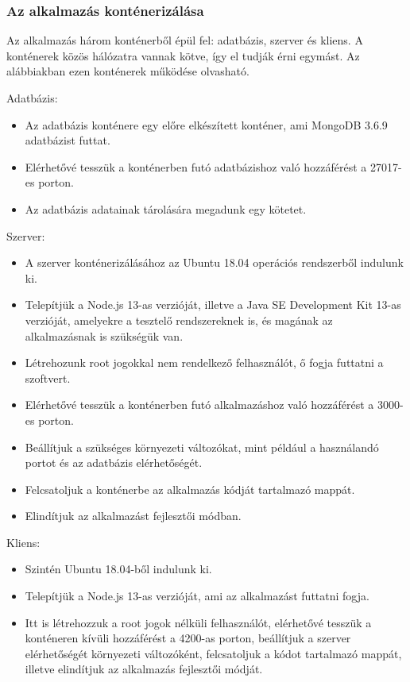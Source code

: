\documentclass{elteikthesis}
\begin{document}
				\subsubsection{Az alkalmazás konténerizálása}
					Az alkalmazás három konténerből épül fel: adatbázis, szerver és kliens. A konténerek közös hálózatra vannak kötve, így el tudják érni egymást. Az alábbiakban ezen konténerek működése olvasható.

					Adatbázis:
					\begin{itemize}
						\setlength\itemsep{-0.5em}
						\item Az adatbázis konténere egy előre elkészített konténer, ami MongoDB 3.6.9 adatbázist futtat.
						\item Elérhetővé tesszük a konténerben futó adatbázishoz való hozzáférést a 27017-es porton.
						\item Az adatbázis adatainak tárolására megadunk egy kötetet.
					\end{itemize}

					Szerver:
					\begin{itemize}
						\setlength\itemsep{-0.5em}
						\item A szerver konténerizálásához az Ubuntu 18.04 operációs rendszerből indulunk ki.
						\item Telepítjük a Node.js 13-as verzióját, illetve a Java SE Development Kit 13-as verzióját, amelyekre a tesztelő rendszereknek is, és magának az alkalmazásnak is szükségük van.
						\item Létrehozunk root jogokkal nem rendelkező felhasználót, ő fogja futtatni a szoftvert.
						\item Elérhetővé tesszük a konténerben futó alkalmazáshoz való hozzáférést a 3000-es porton.
						\item Beállítjuk a szükséges környezeti változókat, mint például a használandó portot és az adatbázis elérhetőségét.
						\item Felcsatoljuk a konténerbe az alkalmazás kódját tartalmazó mappát.
						\item Elindítjuk az alkalmazást fejlesztői módban.
					\end{itemize}

					Kliens:
					\begin{itemize}
						\setlength\itemsep{-0.5em}
						\item Szintén Ubuntu 18.04-ből indulunk ki.
						\item Telepítjük a Node.js 13-as verzióját, ami az alkalmazást futtatni fogja.
						\item Itt is létrehozzuk a root jogok nélküli felhasználót, elérhetővé tesszük a konténeren kívüli hozzáférést a 4200-as porton, beállítjuk a szerver elérhetőségét környezeti változóként, felcsatoljuk a kódot tartalmazó mappát, illetve elindítjuk az alkalmazás fejlesztői módját.
					\end{itemize}
\end{document}
